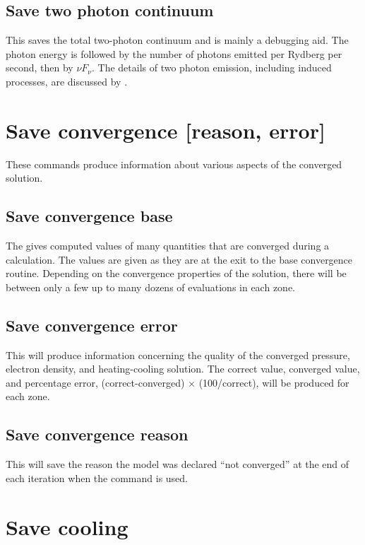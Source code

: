 \subsection{Save two photon continuum}

This saves the total two-photon continuum and is mainly a debugging
aid.  The photon energy is followed by the number of photons emitted per
Rydberg per second, then by $\nu F_\nu$.  The details of two photon emission,
including induced processes, are discussed by \citet{Bottorff2006}.

\section{Save convergence [reason, error]}

These commands produce information about various aspects of the converged
solution.

\subsection{Save convergence base}

The gives computed values of many quantities that are converged during
a calculation.  The values are given as they are at the exit to the base
convergence routine.  Depending on the convergence properties of the
solution, there will be between only a few up to many
dozens of evaluations in each zone.

\subsection{Save convergence error}

This will produce information concerning the quality of the converged
pressure, electron density, and heating-cooling solution.  The correct value,
converged value, and percentage error, (correct-converged) $\times$ (100/correct), will be produced for each zone.

\subsection{Save convergence reason}

This will save the reason the model was declared ``not converged'' at
the end of each iteration when the
 command is used.

\section{Save cooling}

